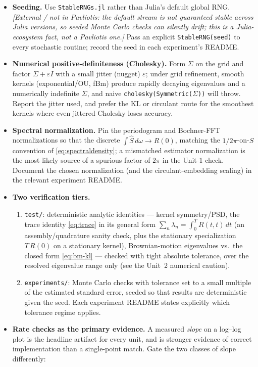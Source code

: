 \documentclass[11pt]{article}
\newcommand{\extnote}[1]{{\small\color{extgray}\emph{[External / not in Pavliotis: #1]}}}
\begin{document}
\begin{itemize}[leftmargin=1.4cm]
  \item \textbf{Seeding.} Use \texttt{StableRNGs.jl} rather than Julia's default global RNG. \extnote{the default stream is not guaranteed stable across Julia versions, so seeded Monte Carlo checks can silently drift; this is a Julia-ecosystem fact, not a Pavliotis one.} Pass an explicit \texttt{StableRNG(seed)} to every stochastic routine; record the seed in each experiment's README.
  \item \textbf{Numerical positive-definiteness (Cholesky).} Form $\Sigma$ on the grid and factor $\Sigma + \varepsilon I$ with a small jitter (nugget) $\varepsilon$; under grid refinement, smooth kernels (exponential/OU, fBm) produce rapidly decaying eigenvalues and a numerically indefinite $\Sigma$, and naive \texttt{cholesky(Symmetric($\Sigma$))} will throw. Report the jitter used, and prefer the KL or circulant route for the smoothest kernels where even jittered Cholesky loses accuracy.
  \item \textbf{Spectral normalization.} Pin the periodogram and Bochner-FFT normalizations so that the discrete $\int\hat S\,d\omega \to R(0)$, matching the $1/2\pi$-on-$S$ convention of \eqref{eq:spectraldensity}; a mismatched estimator normalization is the most likely source of a spurious factor of $2\pi$ in the Unit-1 check. Document the chosen normalization (and the circulant-embedding scaling) in the relevant experiment README.
  \item \textbf{Two verification tiers.}
  \begin{enumerate}
    \item \texttt{test/}: deterministic analytic identities --- kernel symmetry/PSD, the trace identity \eqref{eq:trace} in its general form $\sum_n\lambda_n = \int_0^T R(t,t)\,dt$ (an assembly/quadrature sanity check, plus the stationary specialization $T\,R(0)$ on a stationary kernel), Brownian-motion eigenvalues vs.\ the closed form \eqref{eq:bm-kl} --- checked with tight absolute tolerance, over the resolved eigenvalue range only (see the Unit~2 numerical caution).
    \item \texttt{experiments/}: Monte Carlo checks with tolerance set to a small multiple of the estimated standard error, seeded so that results are deterministic given the seed. Each experiment README states explicitly which tolerance regime applies.
  \end{enumerate}
  \item \textbf{Rate checks as the primary evidence.} A measured \emph{slope} on a log--log plot is the headline artifact for every unit, and is stronger evidence of correct implementation than a single-point match. Gate the two classes of slope differently:

\end{itemize}
\end{document}
